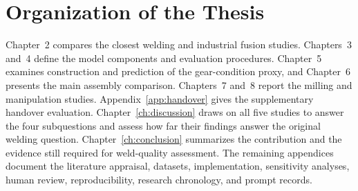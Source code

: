 \section{Organization of the Thesis}
Chapter~2 compares the closest welding and industrial fusion studies. Chapters~3 and~4 define the model components and evaluation procedures. Chapter~5 examines construction and prediction of the gear-condition proxy, and Chapter~6 presents the main assembly comparison. Chapters~7 and~8 report the milling and manipulation studies. Appendix~\ref{app:handover} gives the supplementary handover evaluation. Chapter~\ref{ch:discussion} draws on all five studies to answer the four subquestions and assess how far their findings answer the original welding question. Chapter~\ref{ch:conclusion} summarizes the contribution and the evidence still required for weld-quality assessment. The remaining appendices document the literature appraisal, datasets, implementation, sensitivity analyses, human review, reproducibility, research chronology, and prompt records.
